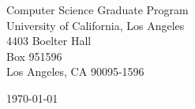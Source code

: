 \begin{minipage}{0.49\textwidth}
\begin{flushleft}
\noindent
Computer Science Graduate Program\\
University of California, Los Angeles\\
4403 Boelter Hall\\
Box 951596\\
Los Angeles, CA 90095-1596
\end{flushleft}
\end{minipage}
\begin{minipage}{0.47\textwidth}
\begin{flushright}
\today
\end{flushright}
\end{minipage} \\

\newcommand{\univ}{University of California, Los Angeles}
\newcommand{\univshort}{UCLA}
\newcommand{\degree}{Ph.D.}
\newcommand{\dept}{Computer Science}
